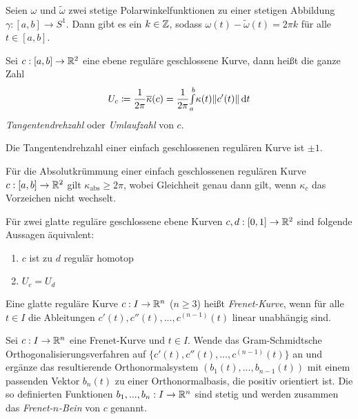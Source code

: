 \documentclass{cheat-sheet}
\newcommand{\Intabdt}[1]{\Int{a}{b}{#1}{t}}
\begin{document}
\begin{satz}
  Seien $\omega$ und $\tilde\omega$ zwei stetige Polarwinkelfunktionen zu einer stetigen Abbildung $\gamma : [a, b] \to S^1$. Dann gibt es ein $k \in \mathbb{Z}$, sodass $\omega(t) - \tilde\omega(t) = 2 \pi k$ für alle $t \in [a, b]$.
\end{satz}

\begin{satz}
  Sei $c : [a, b] \to \mathbb{R}^2$ eine ebene reguläre geschlossene Kurve, dann heißt die ganze Zahl
  \[ U_c \coloneqq \frac{1}{2 \pi} \overline\kappa(c) = \frac{1}{2 \pi} \Intabdt{\kappa(t) \| c'(t) \|} \]
  \emph{Tangentendrehzahl} oder \emph{Umlaufzahl} von $c$.
\end{satz}

\begin{satz}
  Die Tangentendrehzahl einer einfach geschlossenen regulären Kurve ist $\pm 1$.
\end{satz}

\begin{satz}
  Für die Absolutkrümmung einer einfach geschlossenen regulären Kurve $c : [a, b] \to \mathbb{R}^2$ gilt $\kappa_{\text{abs}} \geq 2 \pi$, wobei Gleichheit genau dann gilt, wenn $\kappa_c$ das Vorzeichen nicht wechselt.
\end{satz}

\begin{satz}
  Für zwei glatte reguläre geschlossene ebene Kurven $c, d : [0, 1] \to \mathbb{R}^2$ sind folgende Aussagen äquivalent:
  \begin{multicols}{2}
    \begin{enumerate}[label=(\roman*),leftmargin=2em]
      \item $c$ ist zu $d$ regulär homotop
      \item $U_c = U_d$
    \end{enumerate}
  \end{multicols}
\end{satz}

\begin{definition}
  Eine glatte reguläre Kurve $c : I \to \mathbb{R}^n$ ($n \geq 3$) heißt \emph{Frenet-Kurve}, wenn für alle $t \in I$ die Ableitungen $c'(t), c''(t), ..., c^{(n-1)}(t)$ linear unabhängig sind.
\end{definition}

\begin{definition}
  Sei $c : I \to \mathbb{R}^n$ eine Frenet-Kurve und $t \in I$. Wende das Gram-Schmidtsche Orthogonalisierungsverfahren auf $\{ c'(t), c''(t), ..., c^{(n-1)}(t) \}$ an und ergänze das resultierende Orthonormalsystem $(b_1(t), ..., b_{n-1}(t))$ mit einem passenden Vektor $b_n(t)$ zu einer Orthonormalbasis, die positiv orientiert ist. Die so definierten Funktionen $b_1, ..., b_n : I \to \mathbb{R}^n$ sind stetig und werden zusammen das \emph{Frenet-$n$-Bein} von $c$ genannt.
\end{definition}
\end{document}
